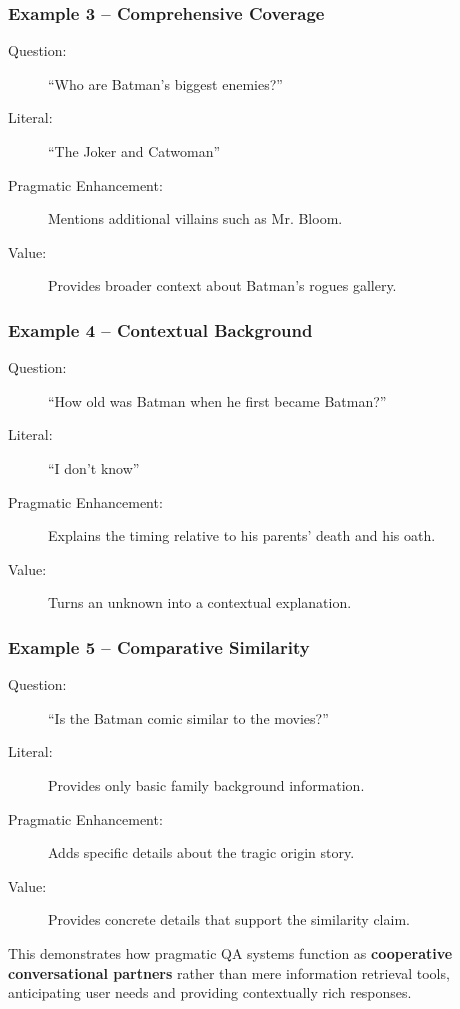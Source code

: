 \documentclass[12pt, letterpaper]{article}
\begin{document}
\subsubsection*{Example 3 -- Comprehensive Coverage}
\begin{description}
    \item[Question:] ``Who are Batman's biggest enemies?''
    \item[Literal:] ``The Joker and Catwoman''
    \item[Pragmatic Enhancement:] Mentions additional villains such as Mr. Bloom.
    \item[Value:] Provides broader context about Batman's rogues gallery.
\end{description}

\subsubsection*{Example 4 -- Contextual Background}
\begin{description}
    \item[Question:] ``How old was Batman when he first became Batman?''
    \item[Literal:] ``I don't know''
    \item[Pragmatic Enhancement:] Explains the timing relative to his parents' death and his oath.
    \item[Value:] Turns an unknown into a contextual explanation.
\end{description}

\subsubsection*{Example 5 -- Comparative Similarity}
\begin{description}
    \item[Question:] ``Is the Batman comic similar to the movies?''
    \item[Literal:] Provides only basic family background information.
    \item[Pragmatic Enhancement:] Adds specific details about the tragic origin story.
    \item[Value:] Provides concrete details that support the similarity claim.
\end{description}

This demonstrates how pragmatic QA systems function as \textbf{cooperative conversational partners} rather than mere information retrieval tools, anticipating user needs and providing contextually rich responses.
\end{document}
